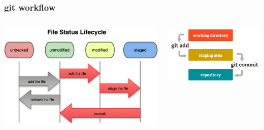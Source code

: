 \documentclass[12pt]{beamer}
\begin{document}
\begin{frame}
\frametitle{git workflow}
\begin{columns}
	\begin{column}{0.5\linewidth}
		\includegraphics[width=\linewidth]{file_workflow}
	\end{column}
	\begin{column}{0.5\linewidth}
		\includegraphics[width=\linewidth]{git_workflow}
	\end{column}
\end{columns}
\end{frame}
\end{document}
